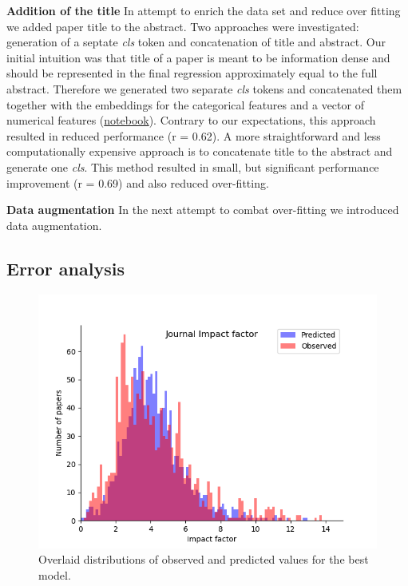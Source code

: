 \documentclass[11pt]{article}
\begin{document}
\textbf{Addition of the title} In attempt to enrich the data set and reduce over fitting we added paper title to the abstract. Two approaches were investigated: generation of a septate \textit{cls}  token and concatenation of title and abstract. Our initial intuition was that title of a paper is meant to be information dense and should be represented in the final regression approximately equal to the full abstract. Therefore we generated two separate \textit{cls} tokens and concatenated them together with the embeddings for the categorical features and a vector of numerical features (\href{https://github.com/ArtemChemist/w266_project/blob/main/Notebooks/sciBERT%20%2B%20sciBERT%20%2B%20small%20meta.ipynb}{notebook}). Contrary to our expectations, this approach resulted in reduced performance (r = 0.62). A more straightforward and less computationally expensive approach is to concatenate title to the abstract and generate one \textit{cls}. This method resulted in small, but significant performance improvement (r = 0.69) and also reduced over-fitting.     

\textbf{Data augmentation} In the next attempt to combat over-fitting we introduced data augmentation.

\subsection{Error analysis}
\begin{figure}
	\includegraphics[width= \columnwidth]{./Images/JIF_hist.png}
	\caption{Overlaid distributions of observed and predicted values for the best model.}
	\label{fig:JIF_hist}
\end{figure}
\end{document}
